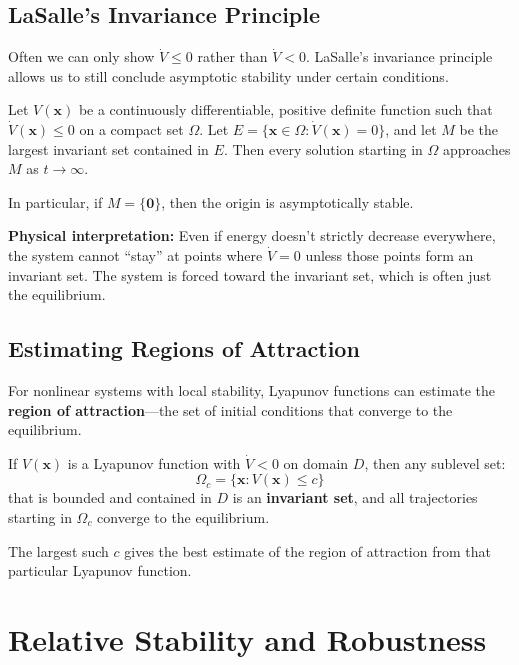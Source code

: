 \subsection{LaSalle's Invariance Principle}

Often we can only show $\dot{V} \leq 0$ rather than $\dot{V} < 0$. LaSalle's invariance principle allows us to still conclude asymptotic stability under certain conditions.

\begin{theorem}
\label{thm:lasalle}
Let $V(\mathbf{x})$ be a continuously differentiable, positive definite function such that $\dot{V}(\mathbf{x}) \leq 0$ on a compact set $\Omega$. Let $E = \{\mathbf{x} \in \Omega : \dot{V}(\mathbf{x}) = 0\}$, and let $M$ be the largest invariant set contained in $E$. Then every solution starting in $\Omega$ approaches $M$ as $t \to \infty$.

In particular, if $M = \{\mathbf{0}\}$, then the origin is asymptotically stable.
\end{theorem}

\textbf{Physical interpretation:} Even if energy doesn't strictly decrease everywhere, the system cannot ``stay'' at points where $\dot{V} = 0$ unless those points form an invariant set. The system is forced toward the invariant set, which is often just the equilibrium.

\subsection{Estimating Regions of Attraction}

For nonlinear systems with local stability, Lyapunov functions can estimate the \textbf{region of attraction}---the set of initial conditions that converge to the equilibrium.

If $V(\mathbf{x})$ is a Lyapunov function with $\dot{V} < 0$ on domain $D$, then any sublevel set:
\begin{equation}
\Omega_c = \{\mathbf{x} : V(\mathbf{x}) \leq c\}
\end{equation}
that is bounded and contained in $D$ is an \textbf{invariant set}, and all trajectories starting in $\Omega_c$ converge to the equilibrium.

The largest such $c$ gives the best estimate of the region of attraction from that particular Lyapunov function.

\section{Relative Stability and Robustness}
\label{sec:relative_stability}

